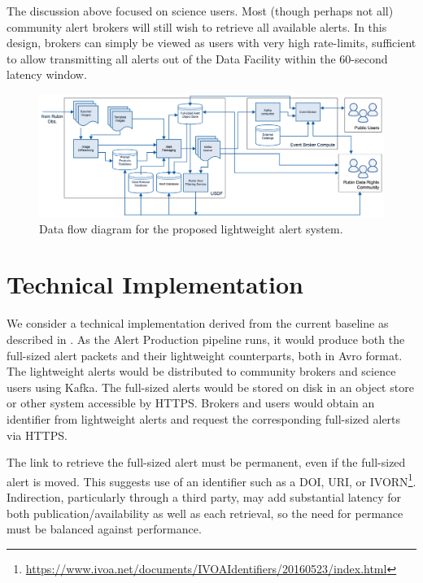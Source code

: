 \documentclass[DM,authoryear,toc]{lsstdoc}
\begin{document}
The discussion above focused on science users.
Most (though perhaps not all) community alert brokers will still wish to retrieve all available alerts.
In this design, brokers can simply be viewed as users with very high rate-limits, sufficient to allow transmitting all alerts out of the Data Facility within the 60-second latency window.


\begin{figure}
  \begin{centering}
  \includegraphics[width=\textwidth]{fig/lightweight_alert_dist.png}
  \caption{Data flow diagram for the proposed lightweight alert system.
  \label{fig:lightweight}}
  \end{centering}
\end{figure}

\section{Technical Implementation}  

We consider a technical implementation derived from the current baseline as described in 
.
As the Alert Production pipeline runs, it would produce both the full-sized alert packets and their lightweight counterparts, both in Avro format.
The lightweight alerts would be distributed to community brokers and science users using Kafka.
The full-sized alerts would be stored on disk in an object store or other system accessible by HTTPS.
Brokers and users would obtain an identifier from lightweight alerts and request the corresponding full-sized alerts via HTTPS.


The link to retrieve the full-sized alert must be permanent, even if the full-sized alert is moved.  
This suggests use of an identifier such as a DOI, URI, or IVORN\footnote{\url{https://www.ivoa.net/documents/IVOAIdentifiers/20160523/index.html}}.
Indirection, particularly through a third party, may add substantial latency for both publication/availability as well as each retrieval, so the need for permance must be balanced against performance.
\end{document}
